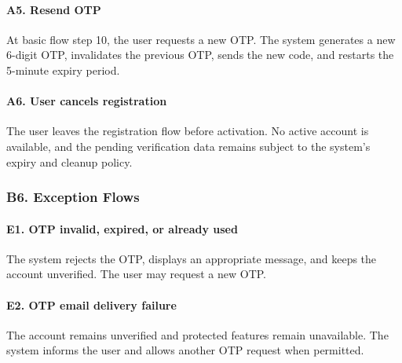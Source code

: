 \documentclass[12pt]{article}
\begin{document}
\paragraph*{A5. Resend OTP}
\par\medskip

At basic flow step 10, the user requests a new OTP. The system generates a new 6-digit OTP, invalidates the previous OTP, sends the new code, and restarts the 5-minute expiry period.
\par\medskip

\hypertarget{sec:a6-user-cancels-registration}{}
\paragraph*{A6. User cancels registration}
\par\medskip

The user leaves the registration flow before activation. No active account is available, and the pending verification data remains subject to the system's expiry and cleanup policy.
\par\medskip

\hypertarget{sec:b6-exception-flows}{}
\subsubsection*{B6. Exception Flows}
\par\medskip

\hypertarget{sec:e1-otp-invalid-expired-or-already-used}{}
\paragraph*{E1. OTP invalid, expired, or already used}
\par\medskip

The system rejects the OTP, displays an appropriate message, and keeps the account unverified. The user may request a new OTP.
\par\medskip

\hypertarget{sec:e2-otp-email-delivery-failure}{}
\paragraph*{E2. OTP email delivery failure}
\par\medskip

The account remains unverified and protected features remain unavailable. The system informs the user and allows another OTP request when permitted.
\par\medskip
\end{document}
